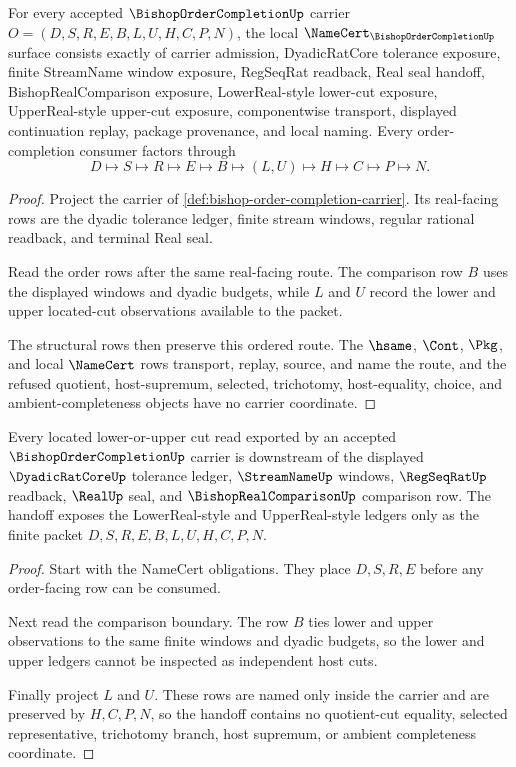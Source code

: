 \begin{theorem}
\label{thm:bishop-order-completion-namecert-obligations}
For every accepted $\BishopOrderCompletionUp$ carrier $O=(D,S,R,E,B,L,U,H,C,P,N)$, the local $\NameCert_{\BishopOrderCompletionUp}$ surface consists exactly of carrier admission, DyadicRatCore tolerance exposure, finite StreamName window exposure, RegSeqRat readback, Real seal handoff, BishopRealComparison exposure, LowerReal-style lower-cut exposure, UpperReal-style upper-cut exposure, componentwise transport, displayed continuation replay, package provenance, and local naming. Every order-completion consumer factors through
$$
D\longmapsto S\longmapsto R\longmapsto E\longmapsto B\longmapsto (L,U)\longmapsto H\longmapsto C\longmapsto P\longmapsto N.
$$
\end{theorem}
\begin{proof}
Project the carrier of \autoref{def:bishop-order-completion-carrier}. Its real-facing rows are the dyadic tolerance ledger, finite stream windows, regular rational readback, and terminal Real seal.

Read the order rows after the same real-facing route. The comparison row $B$ uses the displayed windows and dyadic budgets, while $L$ and $U$ record the lower and upper located-cut observations available to the packet.

The structural rows then preserve this ordered route. The $\hsame$, $\Cont$, $\Pkg$, and local $\NameCert$ rows transport, replay, source, and name the route, and the refused quotient, host-supremum, selected, trichotomy, host-equality, choice, and ambient-completeness objects have no carrier coordinate.
\end{proof}

\begin{theorem}
\label{thm:bishop-order-completion-located-cut-handoff}
Every located lower-or-upper cut read exported by an accepted $\BishopOrderCompletionUp$ carrier is downstream of the displayed $\DyadicRatCoreUp$ tolerance ledger, $\StreamNameUp$ windows, $\RegSeqRatUp$ readback, $\RealUp$ seal, and $\BishopRealComparisonUp$ comparison row. The handoff exposes the LowerReal-style and UpperReal-style ledgers only as the finite packet $D,S,R,E,B,L,U,H,C,P,N$.
\end{theorem}
\begin{proof}
Start with the NameCert obligations. They place $D,S,R,E$ before any order-facing row can be consumed.

Next read the comparison boundary. The row $B$ ties lower and upper observations to the same finite windows and dyadic budgets, so the lower and upper ledgers cannot be inspected as independent host cuts.

Finally project $L$ and $U$. These rows are named only inside the carrier and are preserved by $H,C,P,N$, so the handoff contains no quotient-cut equality, selected representative, trichotomy branch, host supremum, or ambient completeness coordinate.
\end{proof}

